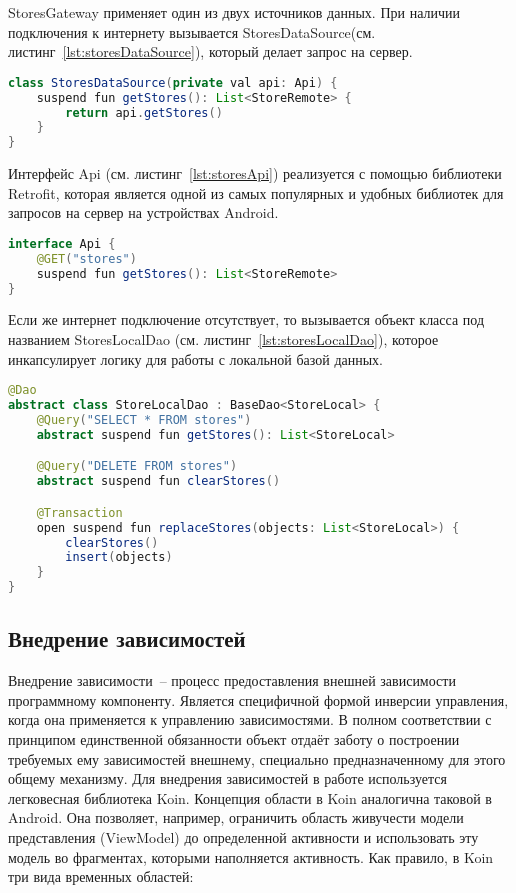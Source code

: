 StoresGateway применяет один из двух источников данных. При наличии подключения к интернету вызывается StoresDataSource(см. листинг~\ref{lst:storesDataSource}), который делает запрос на сервер.

\begin{lstlisting}[language=Java,label={lst:storesDataSource},caption={StoresDataSource}]
class StoresDataSource(private val api: Api) {
    suspend fun getStores(): List<StoreRemote> {
        return api.getStores()
    }
}
\end{lstlisting}

Интерфейс Api (см. листинг~\ref{lst:storesApi}) реализуется с помощью библиотеки Retrofit, которая является одной из самых популярных и удобных библиотек для запросов на сервер на устройствах Android.

\begin{lstlisting}[language=Java,label={lst:storesApi},caption={Api}]
interface Api {
    @GET("stores")
    suspend fun getStores(): List<StoreRemote>
}
\end{lstlisting}

Если же интернет подключение отсутствует, то вызывается объект класса под названием StoresLocalDao (см. листинг~\ref{lst:storesLocalDao}), которое инкапсулирует логику для работы с локальной базой данных.
\begin{lstlisting}[language=Java,label={lst:storesLocalDao},caption={StoresLocalDao}]
@Dao
abstract class StoreLocalDao : BaseDao<StoreLocal> {
    @Query("SELECT * FROM stores")
    abstract suspend fun getStores(): List<StoreLocal>

    @Query("DELETE FROM stores")
    abstract suspend fun clearStores()

    @Transaction
    open suspend fun replaceStores(objects: List<StoreLocal>) {
        clearStores()
        insert(objects)
    }
}
\end{lstlisting}

\subsection{Внедрение зависимостей}
Внедрение зависимости~-- процесс предоставления внешней зависимости программному компоненту. Является специфичной формой инверсии управления, когда она применяется к управлению зависимостями. В полном соответствии с принципом единственной обязанности объект отдаёт заботу о построении требуемых ему зависимостей внешнему, специально предназначенному для этого общему механизму. Для внедрения зависимостей в работе используется легковесная библиотека Koin. Концепция области в Koin аналогична таковой в Android. Она позволяет, например, ограничить область живучести модели представления (ViewModel) до определенной активности и использовать эту модель во фрагментах, которыми наполняется активность. Как правило, в Koin три вида временных областей:

